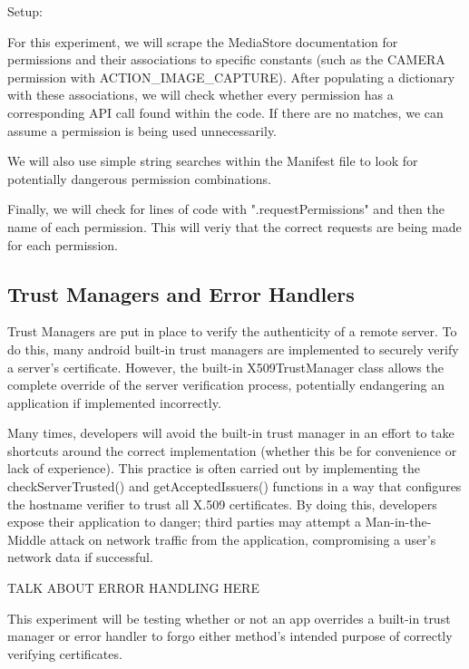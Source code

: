         Setup: 
        
        For this experiment, we will scrape the MediaStore documentation
        for permissions and their associations to specific constants (such 
        as the CAMERA permission with ACTION\_IMAGE\_CAPTURE). After populating 
        a dictionary with these associations, we will check whether every permission
        has a corresponding API call found within the code. If there are no matches,
        we can assume a permission is being used unnecessarily.
        
        We will also use simple string searches within the Manifest file to look 
        for potentially dangerous permission combinations.

        Finally, we will check for lines of code with ".requestPermissions" and then
        the name of each permission. This will veriy that the correct requests are being
        made for each permission.

    \subsection{Trust Managers and Error Handlers}

        Trust Managers are put in place to verify the authenticity of a 
        remote server. To do this, many android built-in trust managers 
        are implemented to securely verify a server's certificate.
        However, the built-in X509TrustManager class allows the complete 
        override of the server verification process, potentially endangering
        an application if implemented incorrectly.

        Many times, developers will avoid the built-in trust manager in an
        effort to take shortcuts around the correct implementation (whether
        this be for convenience or lack of experience). This practice is often
        carried out by implementing the checkServerTrusted() and getAcceptedIssuers() 
        functions in a way that configures the hostname verifier to trust all X.509
        certificates. By doing this, developers expose their application to danger; 
        third parties may attempt a Man-in-the-Middle attack on network traffic
        from the application, compromising a user's network data if successful.

        TALK ABOUT ERROR HANDLING HERE

        This experiment will be testing whether or not an app overrides a built-in
        trust manager or error handler to forgo either method's intended purpose of
        correctly verifying certificates.

